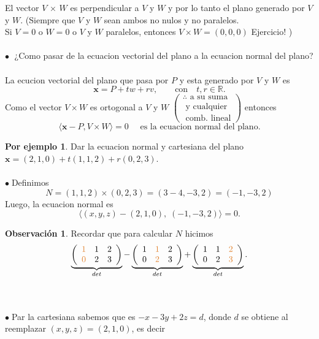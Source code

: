 \documentclass{article}
\theoremstyle{definition}
\theoremstyle{definition}
\newtheorem*{obs}{Observación}
\newtheorem*{ej}{Por ejemplo}
\theoremstyle{remark}
\newcommand\bl{$\bullet\;$}
\begin{document}
El vector $V$ $\times$ $W$ es perpendicular a $V$ y $W$ y por lo tanto el plano generado por $V$ y $W$. \big(Siempre que $V$ y $W$ sean ambos no nulos y no paralelos. \\ Si $V=0$ o $W=0$ o $V$ y $W$ paralelos, entonces $V \times W = (0,0,0)$ \quad Ejercicio! \big)
\\\\
\textcolor{rojop2}{\bl} ¿Como pasar de la ecuacion vectorial del plano a la ecuacion normal del plano? \\\\
La ecucion vectorial del plano que pasa por $P$ y esta generado por $V$ y $W$ es \[
  \mathbf{x}=P+tw+rv,\quad \quad \text{con}\quad t,r \in \mathbb{R}. 
\]
Como el vector $V \times W$ es ortogonal a $V$ y $W$ $\left(\begin{array}{l}
  \therefore \text{ a su suma } \\ 
  \text{ y cualquier } \\ 
  \text{ comb. lineal}
  \end{array}\right)$ entonces \[ 
  \langle \mathbf{x}-P, V \times W \rangle = 0 \quad \text{ es la ecuacion normal del plano.}
\]
\begin{ej}
  Dar la ecuacion normal y cartesiana del plano $\mathbf{x}=(2,1,0)+t(1,1,2)+r(0,2,3)$. \\\\ \bl Definimos $$N=(1,1,2) \times (0,2,3) = (3-4,-3,2)=(-1,-3,2)$$ Luego, la ecuacion normal es \[
\langle (x,y,z)-(2,1,0), \; (-1,-3,2)\rangle = 0.
  \]
\end{ej}
\begin{obs}
  Recordar que para calcular $N$ hicimos \[
\underbrace{\left(\begin{array}{lll}
      \textcolor{rojop2}{1} & 1 & 2 \\ 
      \textcolor{rojop2}{0} & 2 & 3 
\end{array}\right)}_{det}
  -
  \underbrace{\left(\begin{array}{lll} 
      1 & \textcolor{rojop2}{1} & 2 \\ 
      0 & \textcolor{rojop2}{2} & 3 
\end{array}\right)}_{det}
  +
  \underbrace{\left(\begin{array}{lll}
      1 & 1 & \textcolor{rojop2}{2} \\ 
      0 & 2 & \textcolor{rojop2}{3} 
  \end{array}\right)}_{det}.
  \]
\end{obs}\;
\\ \\ \bl Par la cartesiana sabemos que es $-x-3y+2z=d$, donde $d$ se obtiene al reemplazar $(x,y,z)=(2,1,0)$, es decir 
\end{document}

